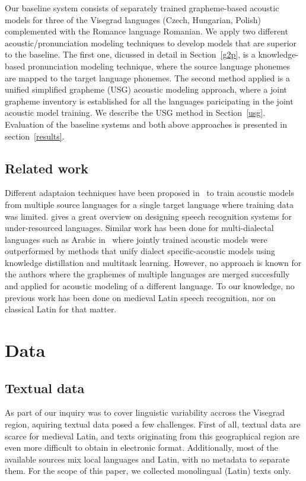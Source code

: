 \documentclass[runningheads,a4paper]{llncs}
\begin{document}
Our baseline system consists of separately trained grapheme-based acoustic models for three of the Visegrad languages (Czech, Hungarian, Polish) complemented with the Romance language Romanian.
We apply two different acoustic/pronunciation modeling techniques to develop models that are superior to the baseline.
The first one, dicussed in detail in Section~\ref{g2p}, is a knowledge-based pronunciation modeling technique, where the source language phonemes are mapped to the target language phonemes.
The second method applied is a unified simplified grapheme (USG) acoustic modeling approach, where a joint grapheme inventory is established for all the languages paricipating in the joint acoustic model training.
We describe the USG method in Section~\ref{usg}.
Evaluation of the baseline systems and both above approaches is presented in section~\ref{results}.

\subsection{Related work}
Different adaptaion techniques have been proposed in~\cite{schultz01} to train acoustic models from multiple source languages for a single target language where training data was limited.
\cite{besacier14} gives a great overview on designing speech recognition systems for under-resourced languages.
Similar work has been done for multi-dialectal languages such as Arabic in~\cite{elfeky16} where jointly trained acoustic models were outperformed by methods that unify dialect specific-acoustic models using knowledge distillation and multitask learning.
However, no  approach is known for the authors where the graphemes of multiple languages are merged succesfully and applied for acoustic modeling of a different language.
To our knowledge, no previous work has been done on medieval Latin speech recognition, nor on classical Latin for that matter.

\section{Data}
\subsection{Textual data}\label{text}
As part of our inquiry was to cover linguistic variability accross the Visegrad region, aquiring textual data posed a few challenges.
First of all, textual data are scarce for medieval Latin, and texts originating from this geographical region are even more difficult to obtain in electronic format.
Additionally, most of the available sources mix local languages and Latin, with no metadata to separate them.
For the scope of this paper, we collected monolingual (Latin) texts only.
\end{document}
